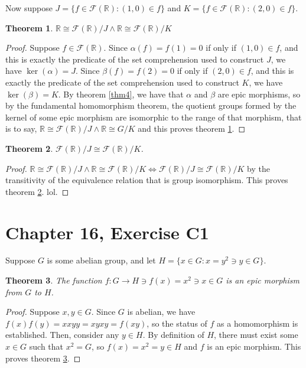 \documentclass[12pt]{article}
\newcommand{\reals}{\mathbb{R}}
\newcommand{\freals}{\mathcal{F}(\reals)}
\newtheorem{thm}{Theorem}
\begin{document}
Now suppose $J = \{ f \in \freals: (1,0) \in f \}$ and
$K = \{ f \in \freals: (2,0) \in f \}$.

\begin{thm} \label{thm5}
	$\reals \cong \freals/J \land \reals \cong \freals/K$
\end{thm}

\begin{proof}
	Suppose $f \in \freals$.
	Since $\alpha(f) = f(1) = 0$ if only if
	$(1,0) \in f$, and this is exactly the predicate
	of the set comprehension used to construct $J$,
	we have $\ker(\alpha) = J$.
	Since $\beta(f) = f(2) = 0$ if only if
	$(2,0) \in f$, and this is exactly the predicate
	of the set comprehension used to construct $K$,
	we have $\ker(\beta) = K$.
	By theorem \ref{thm4}, we have that
	$\alpha$ and $\beta$ are epic morphisms,
	so by the fundamental homomorphism theorem,
	the quotient groups formed by the kernel of
	some epic morphism are isomorphic to the range
	of that morphism, that is to say,
	$\reals \cong \freals/J \land \reals \cong G/K$
	and this proves theorem \ref{thm5}.
\end{proof}

\begin{thm} \label{thm6}
	$\freals/J \cong \freals/K$.
\end{thm}

\begin{proof}
	$\reals \cong \freals/J \land \reals \cong \freals/K \iff \freals/J \cong \freals/K$
	by the transitivity of the equivalence relation that is group isomorphism.
	This proves theorem \ref{thm6}. lol.
\end{proof}

\section{Chapter 16, Exercise C1}

Suppose $G$ is some abelian group,
and let $H = \{x \in G: x = y^2 \ni y \in G \}$.

\begin{thm} \label{thm7}
	The function $f:G \to H \ni f(x) = x^2 \ni x \in G$ is an epic morphism from $G$ to $H$.
\end{thm}

\begin{proof}
	Suppose $x,y \in G$.
	Since $G$ is abelian, we have $f(x)f(y) = xxyy = xyxy = f(xy)$,
	so the status of $f$ as a homomorphism is established.
	Then, consider any $y \in H$. By definition of $H$,
	there must exist some $x \in G$ such that $x^2 = G$,
	so $f(x) = x^2 = y \in H$ and $f$ is an epic morphism.
	This proves theorem \ref{thm7}.
\end{proof}
\end{document}
